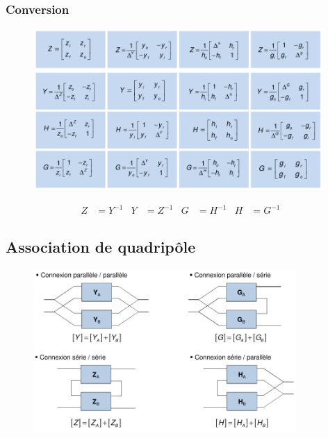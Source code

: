 \documentclass{report}
\begin{document}
\subsubsection{Conversion}
\begin{figure}[H]
\centering
\includegraphics[width=11cm]{img/Conversion.png}
\end{figure}
\begin{align*}
Z &= Y^{-1} & Y&= Z^{-1} & G &= H^{-1} & H &= G^{-1}
\end{align*}

\subsection{Association de quadripôle}
\begin{figure}[H]
\centering
\includegraphics[width=10cm]{img/Assoc.png}
\end{figure}
\end{document}
